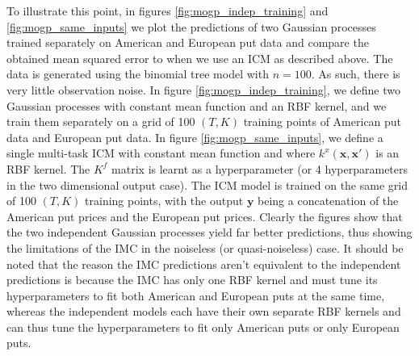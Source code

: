 \documentclass[a4paper,12pt]{article}
\begin{document}
\noindent To illustrate this point, in figures \ref{fig:mogp_indep_training} and \ref{fig:mogp_same_inputs} we plot the predictions of two Gaussian processes trained separately on American and European put data and compare the obtained mean squared error to when we use an ICM as described above. The data is generated using the binomial tree model with $n = 100$. As such, there is very little observation noise. In figure \ref{fig:mogp_indep_training}, we define two Gaussian processes with constant mean function and an RBF kernel, and we train them separately on a grid of 100 $(T, K)$ training points of American put data and European put data. In figure \ref{fig:mogp_same_inputs}, we define a single multi-task ICM with constant mean function and where $k^x(\mathbf{x}, \mathbf{x'})$ is an RBF kernel. The $K^f$ matrix is learnt as a hyperparameter (or 4 hyperparameters in the two dimensional output case). The ICM model is trained on the same grid of 100 $(T, K)$ training points, with the output $\mathbf{y}$ being a concatenation of the American put prices and the European put prices. Clearly the figures show that the two independent Gaussian processes yield far better predictions, thus showing the limitations of the IMC in the noiseless (or quasi-noiseless) case. It should be noted that the reason the IMC predictions aren't equivalent to the independent predictions is because the IMC has only one RBF kernel and must tune its hyperparameters to fit both American and European puts at the same time, whereas the independent models each have their own separate RBF kernels and can thus tune the hyperparameters to fit only American puts or only European puts.
\end{document}
